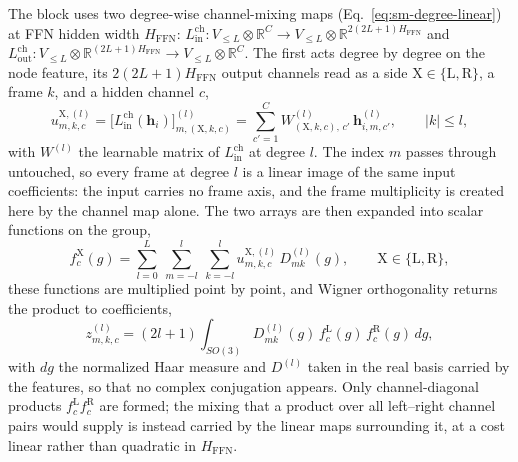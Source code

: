The block uses two degree-wise channel-mixing maps (Eq.~\eqref{eq:sm-degree-linear}) at FFN hidden width $H_{\mathrm{FFN}}$: $L^{\mathrm{ch}}_{\mathrm{in}}:V_{\le L}\otimes\mathbb{R}^{C}\to V_{\le L}\otimes\mathbb{R}^{2(2L+1)H_{\mathrm{FFN}}}$ and $L^{\mathrm{ch}}_{\mathrm{out}}:V_{\le L}\otimes\mathbb{R}^{(2L+1)H_{\mathrm{FFN}}}\to V_{\le L}\otimes\mathbb{R}^{C}$.
The first acts degree by degree on the node feature, its $2(2L+1)H_{\mathrm{FFN}}$ output channels read as a side $\mathrm{X}\in\{\mathrm{L},\mathrm{R}\}$, a frame $k$, and a hidden channel $c$,
\begin{equation}
    u^{\mathrm{X},(l)}_{m,k,c}
    = \bigl[L^{\mathrm{ch}}_{\mathrm{in}}(\mathbf{h}_i)\bigr]^{(l)}_{m,(\mathrm{X},k,c)}
    = \sum_{c'=1}^{C} W^{(l)}_{(\mathrm{X},k,c),\,c'}\,
      \mathbf{h}^{(l)}_{i,m,c'},
    \qquad |k|\le l,
    \label{eq:dpa4-wbb-lift}
\end{equation}
with $W^{(l)}$ the learnable matrix of $L^{\mathrm{ch}}_{\mathrm{in}}$ at degree $l$.
The index $m$ passes through untouched, so every frame at degree $l$ is a linear image of the same input coefficients: the input carries no frame axis, and the frame multiplicity is created here by the channel map alone.
The two arrays are then expanded into scalar functions on the group,
\begin{equation}
    f^{\mathrm{X}}_{c}(g)
    = \sum_{l=0}^{L}\ \sum_{m=-l}^{l}\ \sum_{k=-l}^{l}
      u^{\mathrm{X},(l)}_{m,k,c}\,D^{(l)}_{mk}(g),
    \qquad \mathrm{X}\in\{\mathrm{L},\mathrm{R}\},
    \label{eq:dpa4-wbb-synth}
\end{equation}
these functions are multiplied point by point, and Wigner orthogonality returns the product to coefficients,
\begin{equation}
    z^{(l)}_{m,k,c}
    = (2l+1)\int_{SO(3)} D^{(l)}_{mk}(g)\,f^{\mathrm{L}}_{c}(g)\,f^{\mathrm{R}}_{c}(g)\,dg ,
    \label{eq:dpa4-wbb-analysis}
\end{equation}
with $dg$ the normalized Haar measure and $D^{(l)}$ taken in the real basis carried by the features, so that no complex conjugation appears.
Only channel-diagonal products $f^{\mathrm{L}}_{c}f^{\mathrm{R}}_{c}$ are formed; the mixing that a product over all left--right channel pairs would supply is instead carried by the linear maps surrounding it, at a cost linear rather than quadratic in $H_{\mathrm{FFN}}$.

